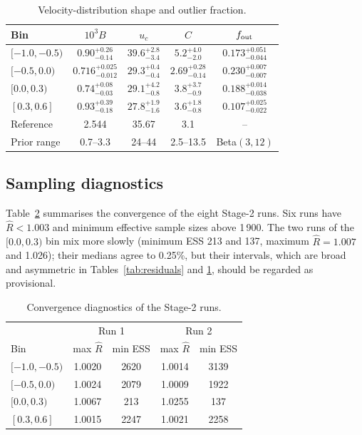 \begin{table}
\caption{Velocity-distribution shape and outlier fraction.}
\label{tab:shape}
\centering
\small
\setlength{\tabcolsep}{4pt}
\begin{tabular}{@{}lcccc@{}}
\toprule
Bin & $10^3B$ & $u_c$ & $C$ & $f_{\rm out}$ \\
\midrule
$[-1.0,-0.5)$ & $0.90^{+0.26}_{-0.14}$ & $39.6^{+2.8}_{-3.4}$ &
 $5.2^{+4.0}_{-2.0}$ & $0.173^{+0.051}_{-0.044}$ \\
$[-0.5,0.0)$ & $0.716^{+0.025}_{-0.012}$ & $29.3^{+0.4}_{-0.4}$ &
 $2.69^{+0.28}_{-0.14}$ & $0.230^{+0.007}_{-0.007}$ \\
$[0.0,0.3)$ & $0.74^{+0.08}_{-0.03}$ & $29.1^{+4.2}_{-0.8}$ &
 $3.8^{+3.7}_{-0.9}$ & $0.188^{+0.014}_{-0.038}$ \\
$[0.3,0.6]$ & $0.93^{+0.39}_{-0.18}$ & $27.8^{+1.9}_{-1.6}$ &
 $3.6^{+1.8}_{-0.8}$ & $0.107^{+0.025}_{-0.022}$ \\
\midrule
Reference & 2.544 & 35.67 & 3.1 & -- \\
Prior range & 0.7--3.3 & 24--44 & 2.5--13.5 & Beta$(3,12)$ \\
\bottomrule
\end{tabular}
\end{table}

\subsection{Sampling diagnostics}

Table~\ref{tab:diagnostics} summarises the convergence of the eight
Stage-2 runs.  Six runs have $\widehat R<1.003$ and minimum effective sample
sizes above 1\,900.  The two runs of the $[0.0,0.3)$ bin mix more slowly
(minimum ESS 213 and 137, maximum $\widehat R=1.007$ and 1.026); their medians
agree to 0.25\%, but their intervals, which are broad and asymmetric in
Tables~\ref{tab:residuals} and \ref{tab:shape}, should be regarded as
provisional.

\begin{table}
\caption{Convergence diagnostics of the Stage-2 runs.}
\label{tab:diagnostics}
\centering
\small
\begin{tabular}{@{}lcccc@{}}
\toprule
 & \multicolumn{2}{c}{Run 1} & \multicolumn{2}{c}{Run 2} \\
Bin & max $\widehat R$ & min ESS & max $\widehat R$ & min ESS \\
\midrule
$[-1.0,-0.5)$ & 1.0020 & 2620 & 1.0014 & 3139 \\
$[-0.5,0.0)$  & 1.0024 & 2079 & 1.0009 & 1922 \\
$[0.0,0.3)$   & 1.0067 & 213  & 1.0255 & 137 \\
$[0.3,0.6]$   & 1.0015 & 2247 & 1.0021 & 2258 \\
\bottomrule
\end{tabular}
\end{table}
